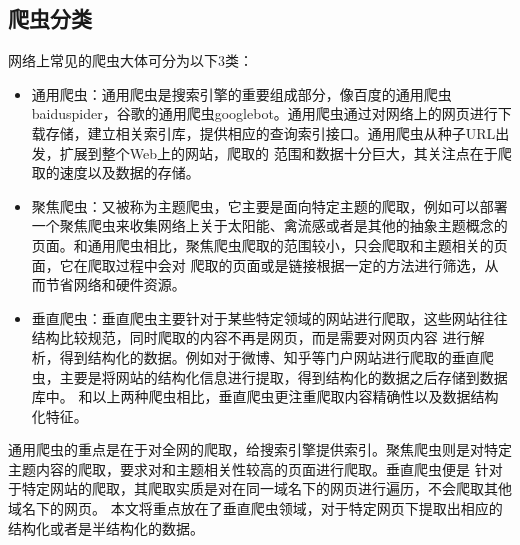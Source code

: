 \documentclass[master]{njuthesis}
\begin{document}
\subsection{爬虫分类}\label{categeries}
网络上常见的爬虫大体可分为以下3类：
\begin{itemize}
\item 通用爬虫：通用爬虫是搜索引擎的重要组成部分\cite{sudeepthi2012survey}，像百度的通用爬虫baiduspider，谷歌的通用爬虫googlebot。通用爬虫通过对网络上的网页进行下载存储，建立相关索引库，提供相应的查询索引接口。通用爬虫从种子URL出发，扩展到整个Web上的网站，爬取的
范围和数据十分巨大，其关注点在于爬取的速度以及数据的存储。
\item 聚焦爬虫：又被称为主题爬虫，它主要是面向特定主题的爬取\cite{agre2015keyword}，例如可以部署一个聚焦爬虫来收集网络上关于太阳能、禽流感或者是其他的抽象主题概念的页面。和通用爬虫相比，聚焦爬虫爬取的范围较小，只会爬取和主题相关的页面，它在爬取过程中会对
爬取的页面或是链接根据一定的方法进行筛选，从而节省网络和硬件资源。
\item 垂直爬虫：垂直爬虫主要针对于某些特定领域的网站进行爬取，这些网站往往结构比较规范，同时爬取的内容不再是网页，而是需要对网页内容
进行解析，得到结构化的数据。例如对于微博、知乎等门户网站进行爬取的垂直爬虫，主要是将网站的结构化信息进行提取，得到结构化的数据之后存储到数据库中。 和以上两种爬虫相比，垂直爬虫更注重爬取内容精确性以及数据结构化特征。
\end{itemize}

通用爬虫的重点是在于对全网的爬取，给搜索引擎提供索引。聚焦爬虫则是对特定主题内容的爬取\cite{kumar2018keyword}，要求对和主题相关性较高的页面进行爬取。垂直爬虫便是
针对于特定网站的爬取，其爬取实质是对在同一域名下的网页进行遍历，不会爬取其他域名下的网页。
本文将重点放在了垂直爬虫领域，对于特定网页下提取出相应的结构化或者是半结构化的数据。


\end{document}
